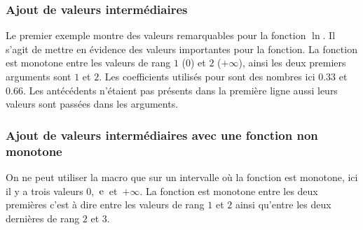 \subsubsection{Ajout de valeurs intermédiaires} 

Le premier exemple montre des valeurs remarquables pour la fonction $\ln$. Il s'agit de mettre en évidence des valeurs importantes pour la fonction. La fonction est monotone  entre les valeurs de rang $1$ ($0$) et $2$ ($+\infty$), ainsi les deux premiers arguments sont $1$  et $2$. Les coefficients utilisés pour   sont des nombres  ici $0.33$ et $0.66$. Les antécédents n'étaient pas présents dans la première ligne aussi leurs valeurs sont passées dans les arguments.

\begin{tkzexample}
\end{tkzexample}

\begin{tkzexample}
\end{tkzexample}

\subsubsection{Ajout de valeurs intermédiaires avec une fonction non monotone } 

On ne peut utiliser la macro que sur un intervalle où la fonction est monotone, ici il y a trois valeurs 
\mbox{$0$, $\mathrm{e}$ et $+\infty$}. La fonction est monotone entre les deux premières c'est à dire entre  les valeurs de rang $1$ et $2$ ainsi qu'entre les deux dernières de rang $2$ et $3$.

\begin{tkzexample}
\end{tkzexample}

